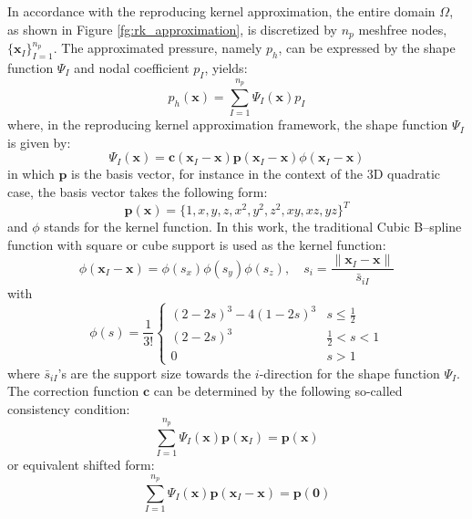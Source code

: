 In accordance with the reproducing kernel approximation, the entire domain $\Omega$, as shown in Figure \ref{fg:rk_approximation}, is discretized by $n_p$ meshfree nodes, $\{\boldsymbol{x}_I\}_{I=1}^{n_p}$. The approximated pressure, namely $p_h$, can be expressed by the shape function $\Psi_I$ and nodal coefficient $p_I$, yields:
\begin{equation}
p_h(\boldsymbol{x}) = \sum_{I=1}^{n_p} \Psi_I(\boldsymbol{x}) p_I
\end{equation}
where, in the reproducing kernel approximation framework, the shape function $\Psi_I$ is given by:
\begin{equation}\label{rkshape}
\Psi_I(\boldsymbol{x}) = \boldsymbol{c}(\boldsymbol{x}_I-\boldsymbol{x}) \boldsymbol{p}(\boldsymbol{x}_I-\boldsymbol{x}) \phi(\boldsymbol{x}_I - \boldsymbol{x})
\end{equation}
in which $\boldsymbol{p}$ is the basis vector, for instance in the context of the 3D quadratic case, the basis vector takes the following form:
\begin{equation}
\boldsymbol{p}(\boldsymbol{x}) = \{ 1, x, y, z, x^2, y^2, z^2, xy, xz, yz\}^T
\end{equation}
and $\phi$ stands for the kernel function. In this work, the traditional Cubic B--spline function with square or cube support is used as the kernel function:
\begin{equation}
\phi(\boldsymbol{x}_I-\boldsymbol{x}) = \phi(s_x) \phi(s_y) \phi(s_z), \quad s_i = \frac{\|\boldsymbol{x}_I - \boldsymbol{x}\|}{\bar{s}_{iI}}
\end{equation}
with
\begin{equation}
\phi(s) = \frac{1}{3!} \begin{cases}
(2-2s)^3 - 4(1-2s)^3 & s\le\frac{1}{2} \\
(2-2s)^3 &\frac{1}{2}<s<1 \\
0 & s> 1
\end{cases}
\end{equation}
where $\bar{s}_{iI}$'s are the support size towards the $i$-direction for the shape function $\Psi_I$. The correction function $\boldsymbol{c}$ can be determined by the following so-called consistency condition:
\begin{equation}\label{cc1}
\sum_{I=1}^{n_p} \Psi_I(\boldsymbol{x}) \boldsymbol{p}(\boldsymbol{x}_I) = \boldsymbol{p} (\boldsymbol{x})
\end{equation}
or equivalent shifted form:
\begin{equation}\label{cc2}
\sum_{I=1}^{n_p} \Psi_I(\boldsymbol{x}) \boldsymbol{p}(\boldsymbol{x}_I-\boldsymbol{x}) = \boldsymbol{p} (\boldsymbol{0})
\end{equation}
